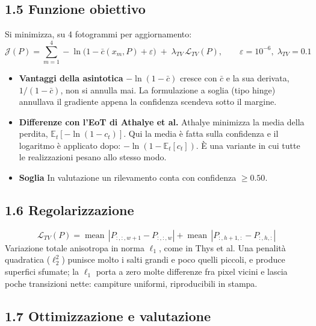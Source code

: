 \documentclass[a4paper, 11pt]{article}
\begin{document}
\subsection*{1.5 Funzione obiettivo}

Si minimizza, su 4 fotogrammi per aggiornamento:
\begin{equation}
\label{eq:obiettivo}
\mathcal{J}(P) = \sum_{m=1}^{4} -\ln\big(1 - \bar{c}(x_m, P) + \varepsilon\big)
\;+\; \lambda_{TV}\, \mathcal{L}_{TV}(P),
\qquad \varepsilon = 10^{-6},\; \lambda_{TV} = 0.1
\end{equation}

\begin{itemize}
\item \textbf{Vantaggi della asintotica} $-\ln(1-\bar{c})$ cresce con $\bar{c}$ e
la sua derivata, $1/(1-\bar{c})$, non si annulla mai. La formulazione a soglia
(tipo hinge) annullava il gradiente appena la confidenza scendeva sotto il
margine.
\item \textbf{Differenze con l'EoT di Athalye et al.} Athalye minimizza la media
della perdita, $\mathbb{E}_t[-\ln(1-c_t)]$. Qui la media è fatta sulla
confidenza e il logaritmo è applicato dopo: $-\ln(1 - \mathbb{E}_t[c_t])$.
È una variante in cui tutte le realizzazioni pesano allo stesso modo.
\item \textbf{Soglia} In valutazione un rilevamento conta con confidenza
$\geq 0.50$.
\end{itemize}

\subsection*{1.6 Regolarizzazione}

\begin{equation}
\mathcal{L}_{TV}(P) = \operatorname{mean}\,|P_{:,:,w+1} - P_{:,:,w}|
+ \operatorname{mean}\,|P_{:,h+1,:} - P_{:,h,:}|
\end{equation}
Variazione totale anisotropa in norma $\ell_1$, come in Thys et al. Una
penalità quadratica ($\ell_2^2$) punisce molto i salti grandi e poco quelli
piccoli, e produce superfici sfumate; la $\ell_1$ porta a zero molte
differenze fra pixel vicini e lascia poche transizioni nette: campiture
uniformi, riproducibili in stampa.

\subsection*{1.7 Ottimizzazione e valutazione}
\end{document}
